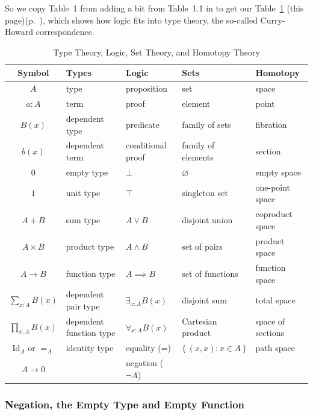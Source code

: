 \documentclass[11pt]{article}
\newcommand{\set}[1]{\{\,#1\,\}}
\begin{document}
So we copy Table~1 from  adding a bit from
Table~1.1 in \citet{rijke} to get our Table~\ref{tab:foo}
{(this page)}{(p.~\pageref{tab:foo})},
which shows how logic fits into type theory,
the so-called Curry-Howard correspondence.
\begin{table}
\caption{Type Theory, Logic, Set Theory, and Homotopy Theory}
\begin{center}
\begin{tabular}{cllll}
Symbol & Types & Logic & Sets & Homotopy \\
\hline
$A$ & type & proposition & set & space \\
$a : A$ & term & proof & element & point \\
$B(x)$ & dependent type & predicate & family of sets & fibration \\
$b(x)$ & dependent term & conditional proof & family of elements & section \\
$0$ & empty type & $\bot$ & $\varnothing$ & empty space \\
$1$ & unit type & $\top$ & singleton set & one-point space \\
$A + B$ & sum type & $A \vee B$ & disjoint union & coproduct space \\
$A \times B$ & product type & $A \wedge B$ & set of pairs & product space \\
$A \to B$ & function type & $A \implies B$ & set of functions & function space
\\
$\sum_{x : A} B(x)$ & dependent pair type & $\exists_{x : A} B(x)$ &
    disjoint sum & total space \\
$\prod_{x : A} B(x)$ & dependent function type & $\forall_{x : A} B(x)$ &
    Cartesian product & space of sections \\
$\text{Id}_A$ or $=_A$ & identity type & equality (=) &
    $\set{(x, x) : x \in A}$ & path space \\
$A \to 0$ & & negation ($\neg A$) & &
\end{tabular}
\end{center}
\label{tab:foo}
\end{table}

\subsubsection{Negation, the Empty Type and Empty Function}
\end{document}
